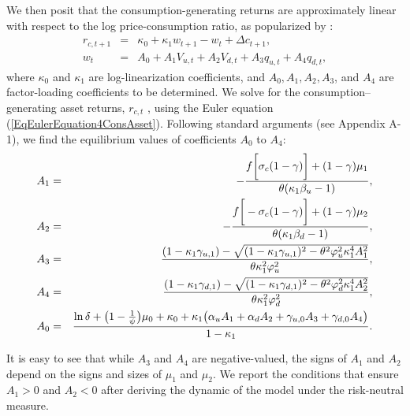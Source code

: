 \documentclass[11pt]{article}
\begin{document}
We then posit that the consumption-generating returns are approximately
linear with respect to the log price-consumption ratio, as popularized by \cite{CampbellShiller88RFS}:
\begin{eqnarray*}
r_{c,t+1} &=&\kappa _{0}+\kappa _{1}w_{t+1}-w_{t}+\Delta c_{t+1},
\label{EqAffineReturns} \\
w_{t} &=&A_{0}+A_{1}V_{u,t}+A_{2}V_{d,t}+A_{3}q_{u,t}+A_{4}q_{d,t},
\label{EqAffinePriceConsumptionLoadings}
\end{eqnarray*}%
where $\kappa_0$ and $\kappa_1$ are log-linearization coefficients, and $%
A_{0},A_{1},A_{2},A_{3}$, and $A_{4}$ are factor-loading coefficients to be
determined. We solve for the consumption--generating asset returns, $r_{c,t}$%
, using the Euler equation (\ref{EqEulerEquation4ConsAsset}). Following standard arguments (see Appendix A-1), we find
the equilibrium values of coefficients $A_0$ to $A_4$:
\begin{eqnarray}
A_{1} &=&-\frac{f\bigg[\sigma _{c}(1-\gamma )\bigg]+(1-\gamma )\mu _{1}}{%
\theta (\kappa _{1}\beta _{u}-1)}, \\
A_{2} &=&-\frac{f\bigg[-\sigma _{c}(1-\gamma )\bigg]+(1-\gamma )\mu _{2}}{%
\theta (\kappa _{1}\beta _{d}-1)}, \\
A_{3} &=&\frac{(1-\kappa _{1}\gamma _{u,1})-\sqrt{(1-\kappa _{1}\gamma
_{u,1})^{2}-\theta ^{2}\varphi _{u}^{2}\kappa _{1}^{4}A_{1}^{2}}}{\theta
\kappa _{1}^{2}\varphi _{u}^{2}}, \\
A_{4} &=&\frac{(1-\kappa _{1}\gamma _{d,1})-\sqrt{(1-\kappa _{1}\gamma
_{d,1})^{2}-\theta ^{2}\varphi _{d}^{2}\kappa _{1}^{4}A_{2}^{2}}}{\theta
\kappa _{1}^{2}\varphi _{d}^{2}}, \\
A_{0} &=&\frac{\ln \delta +\big(1-\frac{1}{\psi }\big)\mu _{0}+\kappa
_{0}+\kappa _{1}\big(\alpha _{u}A_{1}+\alpha _{d}A_{2}+\gamma
_{u,0}A_{3}+\gamma _{d,0}A_{4}\big)}{1-\kappa _{1}}.
\end{eqnarray}

It is easy to see that while $A_3$ and $A_4$ are negative-valued, the signs of $A_1$ and $A_2$ depend on the signs and sizes of $\mu_1$ and $\mu_2$. We report the conditions that ensure $A_1>0$ and $A_2<0$ after deriving the dynamic of the model under the risk-neutral measure.
\end{document}
